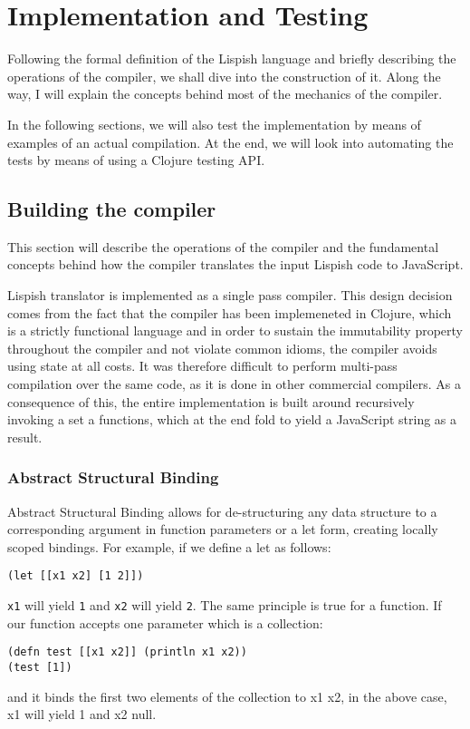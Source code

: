 \chapter{Implementation and Testing}
Following the formal definition of the Lispish language and briefly describing the operations of the compiler, we shall dive into the construction of it. Along the way, I will explain the concepts behind most of the mechanics of the compiler. 

In the following sections, we will also test the implementation by means of examples of an actual compilation. 
At the end, we will look into automating the tests by means of using a Clojure testing API.  

\section{Building the compiler}
This section will describe the operations of the compiler and the fundamental concepts behind how the compiler translates the input Lispish code to JavaScript. 

Lispish translator is implemented as a single pass compiler.
This design decision comes from the fact that the compiler has been implemeneted in Clojure, which is a strictly functional language and in order to sustain the immutability property throughout the compiler and not violate common idioms, the compiler avoids using state at all costs. It was therefore difficult to perform multi-pass compilation over the same code, as it is done in other commercial compilers. 
As a consequence of this, the entire implementation is built around recursively invoking a set a functions, which at the end fold to yield a JavaScript string as a result. 

\subsection{Abstract Structural Binding}
Abstract Structural Binding allows for de-structuring any data structure to a corresponding argument in function parameters or a let form, creating locally scoped bindings.
For example, if we define a let as follows:
\begin{verbatim}
(let [[x1 x2] [1 2]])
\end{verbatim}
\texttt{x1} will yield \texttt{1} and \texttt{x2} will yield \texttt{2}.
The same principle is true for a function.
If our function accepts one parameter which is a collection:

\begin{verbatim}
(defn test [[x1 x2]] (println x1 x2))
(test [1])
\end{verbatim}
and it binds the first two elements of the collection to x1 x2, in the above case, x1 will yield 1 and x2 null.

